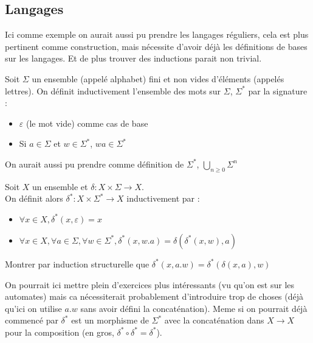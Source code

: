 \subsection{Langages}

\begin{com}
	Ici comme exemple on aurait aussi pu prendre les langages réguliers, cela est plus pertinent comme construction, mais nécessite d'avoir déjà les définitions de bases sur les langages. Et de plus trouver des inductions parait non trivial.\\
\end{com}

\begin{definition}
	Soit $\Sigma$ un ensemble (appelé alphabet) fini et non vides d'éléments (appelés lettres). On définit inductivement l'ensemble des mots sur $\Sigma$, $\Sigma^*$ par la signature : \begin{itemize}
		\item $\varepsilon$ (le mot vide) comme cas de base
		\item Si $a \in \Sigma$ et $w \in \Sigma^*$, $wa\in \Sigma^*$
	\end{itemize}
\end{definition}

\begin{rem}
	On aurait aussi pu prendre comme définition de $\Sigma^*$, $\bigcup\limits_{n \geq 0} \Sigma^n$
\end{rem}

\begin{definition}
	Soit $X$ un ensemble et $\delta : X \times \Sigma \to X$.\\
	On définit alors $\delta^* : X \times \Sigma^* \to X$ inductivement par :\begin{itemize}
		\item $\forall x \in X, \delta^*(x, \varepsilon) = x$
		\item $\forall x \in X, \forall a \in \Sigma, \forall w\in \Sigma^*, \delta^*(x, w.a) = \delta(\delta^*(x, w), a)$
	\end{itemize}
\end{definition}

\begin{exercise}
	Montrer par induction structurelle que $\delta^*(x, a.w) = \delta^*( \delta(x, a), w)$
\end{exercise}

\begin{com}
	On pourrait ici mettre plein d'exercices plus intéressants (vu qu'on est sur les automates) mais ca nécessiterait probablement d'introduire trop de choses (déjà qu'ici on utilise $a.w$ sans avoir défini la concaténation). Meme si on pourrait déjà commencé par $\delta^*$ est un morphisme de $\Sigma^*$ avec la concaténation dans $X \to X$ pour la composition (en gros, $\delta^*\circ \delta^* = \delta^*$).
\end{com}

